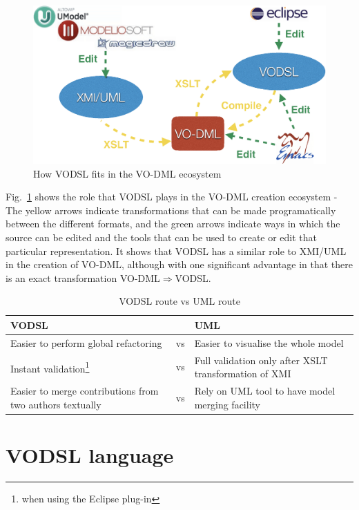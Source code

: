\documentclass[11pt,a4paper]{ivoa}
\begin{document}
\begin{figure}
\centering
\includegraphics[width=\textwidth]{ecosystem.png}
\caption{How VODSL fits in the VO-DML ecosystem}
\label{fig:ecosystem}
\end{figure}

Fig.~\ref{fig:ecosystem} shows the role that VODSL plays in the VO-DML creation ecosystem - The yellow arrows indicate transformations that can
be made programatically between the different formats, and the green arrows indicate ways in which the source can be edited and the tools that can be
used to create or edit that particular representation. It shows that VODSL has a similar role to XMI/UML in the creation of VO-DML, although with one
significant advantage in that there is an exact transformation VO-DML$\Rightarrow$VODSL.

\begin{table}
\begin{tabular}{p{}p{}p{}}
VODSL&& UML \\
\hline
Easier to perform global refactoring & vs & Easier to visualise the whole model \\
Instant validation\footnote{when using the Eclipse plug-in} & vs & Full validation only after XSLT transformation of XMI \\
Easier to merge contributions from two authors textually & vs & Rely on UML tool to have model merging facility \\
\end{tabular}
\caption{VODSL route vs UML route}
\label{table:comparison}
\end{table}

\section{VODSL language}
\end{document}
